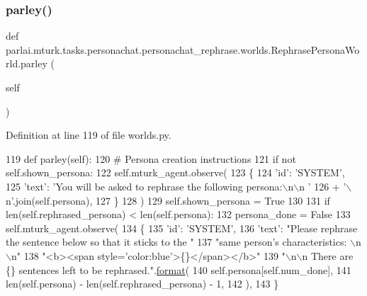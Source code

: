\subsubsection{\texorpdfstring{parley()}{parley()}}
{\footnotesize\ttfamily def parlai.\+mturk.\+tasks.\+personachat.\+personachat\+\_\+rephrase.\+worlds.\+Rephrase\+Persona\+World.\+parley (\begin{DoxyParamCaption}\item[{}]{self }\end{DoxyParamCaption})}



Definition at line 119 of file worlds.\+py.


\begin{DoxyCode}
119     \textcolor{keyword}{def }parley(self):
120         \textcolor{comment}{# Persona creation instructions}
121         \textcolor{keywordflow}{if} \textcolor{keywordflow}{not} self.shown\_persona:
122             self.mturk\_agent.observe(
123                 \{
124                     \textcolor{stringliteral}{'id'}: \textcolor{stringliteral}{'SYSTEM'},
125                     \textcolor{stringliteral}{'text'}: \textcolor{stringliteral}{'You will be asked to rephrase the following persona:\(\backslash\)n\(\backslash\)n '}
126                     + \textcolor{stringliteral}{'\(\backslash\)n'}.join(self.persona),
127                 \}
128             )
129             self.shown\_persona = \textcolor{keyword}{True}
130 
131         \textcolor{keywordflow}{if} len(self.rephrased\_persona) < len(self.persona):
132             persona\_done = \textcolor{keyword}{False}
133             self.mturk\_agent.observe(
134                 \{
135                     \textcolor{stringliteral}{'id'}: \textcolor{stringliteral}{'SYSTEM'},
136                     \textcolor{stringliteral}{'text'}: \textcolor{stringliteral}{"Please rephrase the sentence below so that it sticks to the "}
137                     \textcolor{stringliteral}{"same person's characteristics: \(\backslash\)n\(\backslash\)n"}
138                     \textcolor{stringliteral}{"<b><span style='color:blue'>\{\}</span></b>"}
139                     \textcolor{stringliteral}{"\(\backslash\)n\(\backslash\)n There are \{\} sentences left to be rephrased."}.\hyperlink{namespaceparlai_1_1chat__service_1_1services_1_1messenger_1_1shared__utils_a32e2e2022b824fbaf80c747160b52a76}{format}(
140                         self.persona[self.num\_done],
141                         len(self.persona) - len(self.rephrased\_persona) - 1,
142                     ),
143                 \}

\end{DoxyCode}
